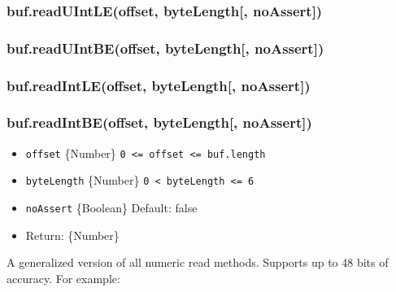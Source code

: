 \subsubsection{buf.readUIntLE(offset, byteLength{[},
noAssert{]})}\label{buf.readuintleoffset-bytelength-noassert}

\subsubsection{buf.readUIntBE(offset, byteLength{[},
noAssert{]})}\label{buf.readuintbeoffset-bytelength-noassert}

\subsubsection{buf.readIntLE(offset, byteLength{[},
noAssert{]})}\label{buf.readintleoffset-bytelength-noassert}

\subsubsection{buf.readIntBE(offset, byteLength{[},
noAssert{]})}\label{buf.readintbeoffset-bytelength-noassert}

\begin{itemize}
\itemsep1pt\parskip0pt
\item
  \texttt{offset} \{Number\}
  \texttt{0\ \textless{}=\ offset\ \textless{}=\ buf.length}
\item
  \texttt{byteLength} \{Number\}
  \texttt{0\ \textless{}\ byteLength\ \textless{}=\ 6}
\item
  \texttt{noAssert} \{Boolean\} Default: false
\item
  Return: \{Number\}
\end{itemize}

A generalized version of all numeric read methods. Supports up to 48
bits of accuracy. For example:

\begin{Shaded}
\begin{Highlighting}[]
  \NormalTok{(}\NormalTok{);}
\NormalTok{(}\NormalTok{, }\NormalTok{);}
\NormalTok{(}\NormalTok{, }\NormalTok{);}
\NormalTok{(}\NormalTok{, }\NormalTok{(}\NormalTok{);  }
\end{Highlighting}
\end{Shaded}

